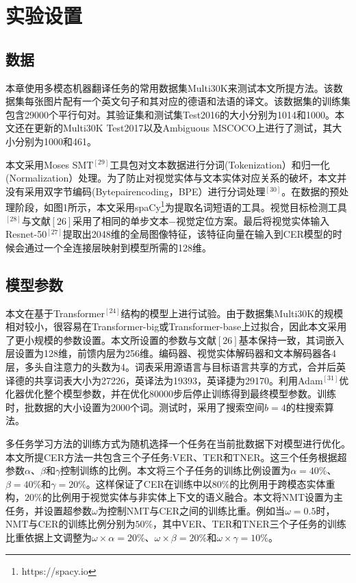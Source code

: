 \section{实验设置}

\subsection{数据}

本章使用多模态机器翻译任务的常用数据集Multi30K来测试本文所提方法。该数据集每张图片配有一个英文句子和其对应的德语和法语的译文。该数据集的训练集包含29000个平行句对。其验证集和测试集Test2016的大小分别为1014和1000。本文还在更新的Multi30K Test2017以及Ambiguous MSCOCO上进行了测试，其大小分别为1000和461。

本文采用Moses SMT$^{[29]}$工具包对文本数据进行分词(Tokenization）和归一化(Normalization）处理。为了防止对视觉实体与文本实体对应关系的破坏，本文并没有采用双字节编码(Bytepairencoding，BPE）进行分词处理$^{[30]}$。在数据的预处理阶段，如图1所示，本文采用spaCy\footnote{https://spacy.io}为提取名词短语的工具。视觉目标检测工具$^{[28]}$与文献${[26]}$采用了相同的单步文本$-$视觉定位方案。最后将视觉实体输入Resnet-50$^{[27]}$提取出2048维的全局图像特征，该特征向量在输入到CER模型的时候会通过一个全连接层映射到模型所需的128维。

\subsection{模型参数}
本文在基于Transformer$^{[24]}$结构的模型上进行试验。由于数据集Multi30K的规模相对较小，很容易在Transformer-big或Transformer-base上过拟合，因此本文采用了更小规模的参数设置。本文所设置的参数与文献${[26]}$基本保持一致，其词嵌入层设置为128维，前馈内层为256维。编码器、视觉实体解码器和文本解码器各4层，多头自注意力的头数为4。词表采用源语言与目标语言共享的方式，合并后英译德的共享词表大小为27226，英译法为19393，英译捷为29170。利用Adam$^{[31]}$优化器优化整个模型参数，并在优化80000步后停止训练得到最终模型参数。训练时，批数据的大小设置为2000个词。测试时，采用了搜索空间$b=4$的柱搜索算法。

多任务学习方法的训练方式为随机选择一个任务在当前批数据下对模型进行优化。本文所提CER方法一共包含三个子任务:VER、TER和TNER。这三个任务根据超参数$\alpha$、$\beta$和$\gamma$控制训练的比例。本文将三个子任务的训练比例设置为$\alpha=40\%$、$\beta=40\%$和$\gamma=20\%$。这样保证了CER在训练中以$80\%$的比例用于跨模态实体重构，$20\%$的比例用于视觉实体与非实体上下文的语义融合。本文将NMT设置为主任务，并设置超参数$\omega$为控制NMT与CER之间的训练比重。例如当$\omega=0.5$时，NMT与CER的训练比例分别为$50\%$，其中VER、TER和TNER三个子任务的训练比重依据上文调整为$\omega\times\alpha=20\%$、$\omega\times\beta=20\%$和$\omega\times\gamma=10\%$。

